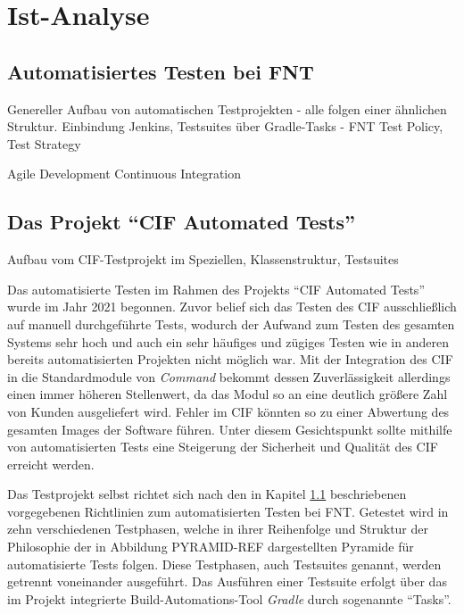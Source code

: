 
\chapter{Ist-Analyse}\label{ch:istanalyse}


\section{Automatisiertes Testen bei FNT}\label{sec:autotestsfnt}
Genereller Aufbau von automatischen Testprojekten - alle folgen einer ähnlichen Struktur. Einbindung Jenkins, Testsuites über Gradle-Tasks - FNT Test Policy, Test Strategy

Agile Development
Continuous Integration

\section{Das Projekt \enquote{CIF Automated Tests}}\label{sec:ciftestprojekt}
Aufbau vom CIF-Testprojekt im Speziellen, Klassenstruktur, Testsuites

Das automatisierte Testen im Rahmen des Projekts \enquote{CIF Automated Tests} wurde im Jahr 2021 begonnen. Zuvor belief sich das Testen des \ac{CIF} ausschließlich auf manuell durchgeführte Tests, wodurch der Aufwand zum Testen des gesamten Systems sehr hoch und auch ein sehr häufiges und zügiges Testen wie in anderen bereits automatisierten Projekten nicht möglich war. Mit der Integration des \ac{CIF} in die Standardmodule von \textit{Command} bekommt dessen Zuverlässigkeit allerdings einen immer höheren Stellenwert, da das Modul so an eine deutlich größere Zahl von Kunden ausgeliefert wird. Fehler im \ac{CIF} könnten so zu einer Abwertung des gesamten Images der Software führen. Unter diesem Gesichtspunkt sollte mithilfe von automatisierten Tests eine Steigerung der Sicherheit und Qualität des \ac{CIF} erreicht werden.

Das Testprojekt selbst richtet sich nach den in Kapitel \ref{sec:autotestsfnt} beschriebenen vorgegebenen Richtlinien zum automatisierten Testen bei FNT. Getestet wird in zehn verschiedenen Testphasen, welche in ihrer Reihenfolge und Struktur der Philosophie der in Abbildung PYRAMID-REF dargestellten Pyramide für automatisierte Tests folgen. Diese Testphasen, auch Testsuites genannt, werden getrennt voneinander ausgeführt. Das Ausführen einer Testsuite erfolgt über das im Projekt integrierte Build-Automations-Tool \textit{Gradle} durch sogenannte \enquote{Tasks}. 

